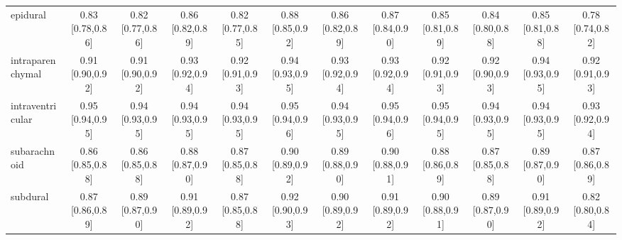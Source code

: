 \begin{tabular}{lccccccccccc}
epidural & 0.83 [0.78,0.86] & 0.82 [0.77,0.86] & 0.86 [0.82,0.89] & 0.82 [0.77,0.85] & 0.88 [0.85,0.92] & 0.86 [0.82,0.89] & 0.87 [0.84,0.90] & 0.85 [0.81,0.89] & 0.84 [0.80,0.88] & 0.85 [0.81,0.88] & 0.78 [0.74,0.82] \\
intraparenchymal & 0.91 [0.90,0.92] & 0.91 [0.90,0.92] & 0.93 [0.92,0.94] & 0.92 [0.91,0.93] & 0.94 [0.93,0.95] & 0.93 [0.92,0.94] & 0.93 [0.92,0.94] & 0.92 [0.91,0.93] & 0.92 [0.90,0.93] & 0.94 [0.93,0.95] & 0.92 [0.91,0.93] \\
intraventricular & 0.95 [0.94,0.95] & 0.94 [0.93,0.95] & 0.94 [0.93,0.95] & 0.94 [0.93,0.95] & 0.95 [0.94,0.96] & 0.94 [0.93,0.95] & 0.95 [0.94,0.96] & 0.95 [0.94,0.95] & 0.94 [0.93,0.95] & 0.94 [0.93,0.95] & 0.93 [0.92,0.94] \\
subarachnoid & 0.86 [0.85,0.88] & 0.86 [0.85,0.88] & 0.88 [0.87,0.90] & 0.87 [0.85,0.88] & 0.90 [0.89,0.92] & 0.89 [0.88,0.90] & 0.90 [0.88,0.91] & 0.88 [0.86,0.89] & 0.87 [0.85,0.88] & 0.89 [0.87,0.90] & 0.87 [0.86,0.89] \\
subdural & 0.87 [0.86,0.89] & 0.89 [0.87,0.90] & 0.91 [0.89,0.92] & 0.87 [0.85,0.88] & 0.92 [0.90,0.93] & 0.90 [0.89,0.92] & 0.91 [0.89,0.92] & 0.90 [0.88,0.91] & 0.89 [0.87,0.90] & 0.91 [0.89,0.92] & 0.82 [0.80,0.84] \\
\bottomrule
\end{tabular}
